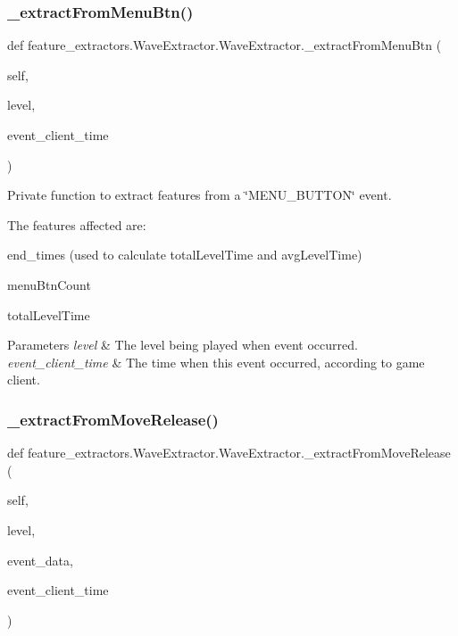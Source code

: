 \subsubsection{\texorpdfstring{\_extractFromMenuBtn()}{\_extractFromMenuBtn()}}
{\footnotesize\ttfamily def feature\+\_\+extractors.\+Wave\+Extractor.\+Wave\+Extractor.\+\_\+extract\+From\+Menu\+Btn (\begin{DoxyParamCaption}\item[{}]{self,  }\item[{}]{level,  }\item[{}]{event\+\_\+client\+\_\+time }\end{DoxyParamCaption})\hspace{0.3cm}{\ttfamily [private]}}



Private function to extract features from a \char`\"{}\+M\+E\+N\+U\+\_\+\+B\+U\+T\+T\+O\+N\char`\"{} event. 

The features affected are\+:
\begin{DoxyItemize}
\item end\+\_\+times (used to calculate total\+Level\+Time and avg\+Level\+Time)
\item menu\+Btn\+Count
\item total\+Level\+Time
\end{DoxyItemize}


\begin{DoxyParams}{Parameters}
{\em level} & The level being played when event occurred. \\
\hline
{\em event\+\_\+client\+\_\+time} & The time when this event occurred, according to game client. \\
\hline
\end{DoxyParams}
\mbox{\label{classfeature__extractors_1_1_wave_extractor_1_1_wave_extractor_a1ff2ae4c3729b9e217a238ddbd614f75}} 
\subsubsection{\texorpdfstring{\_extractFromMoveRelease()}{\_extractFromMoveRelease()}}
{\footnotesize\ttfamily def feature\+\_\+extractors.\+Wave\+Extractor.\+Wave\+Extractor.\+\_\+extract\+From\+Move\+Release (\begin{DoxyParamCaption}\item[{}]{self,  }\item[{}]{level,  }\item[{}]{event\+\_\+data,  }\item[{}]{event\+\_\+client\+\_\+time }\end{DoxyParamCaption})\hspace{0.3cm}{\ttfamily [private]}}



